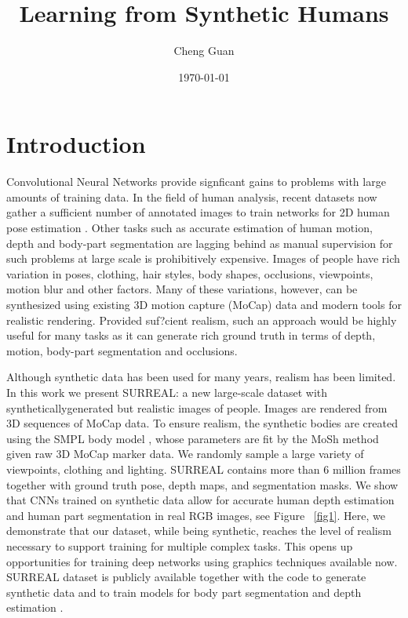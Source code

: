 \documentclass[10pt,twocolumn,a4paper]{article}
\title{\textbf{Learning from Synthetic Humans}}
\author{Cheng Guan}
\date{\today}
\begin{document}
\maketitle
\section{\textbf{Introduction}}
Convolutional Neural Networks provide signficant gains to problems with large amounts of training data. In the field of human analysis, recent datasets \cite{andriluka20142d,oliveira2016deep} now gather a sufficient number of annotated images to train networks for 2D human pose estimation \cite{okada2008relevant}. Other tasks such as accurate estimation of human motion, depth and body-part segmentation are lagging behind as manual supervision for such problems at large scale is prohibitively expensive. Images of people have rich variation in poses, clothing, hair styles, body shapes, occlusions, viewpoints, motion blur and other factors. Many of these variations, however, can be synthesized using existing 3D motion capture (MoCap) data  and modern tools for realistic rendering. Provided suf?cient realism, such an approach would be highly useful for many tasks as it can generate rich ground truth in terms of depth, motion, body-part segmentation and occlusions.
\par
Although synthetic data has been used for many years, realism has been limited. In this work we present SURREAL: a new large-scale dataset with syntheticallygenerated but realistic images of people. Images are rendered from 3D sequences of MoCap data. To ensure realism, the synthetic bodies are created using the SMPL body model , whose parameters are fit by the MoSh  method given raw 3D MoCap marker data. We randomly sample a large variety of viewpoints, clothing and lighting. SURREAL contains more than 6 million frames together with ground truth pose, depth maps, and segmentation masks. We show that CNNs trained on synthetic data allow for accurate human depth estimation and human part segmentation in real RGB images, see Figure ~\ref{fig1}. Here, we demonstrate that our dataset, while being synthetic, reaches the level of realism necessary to support training for multiple complex tasks. This opens up opportunities for training deep networks using graphics techniques available now. SURREAL dataset is publicly available together with the code to generate synthetic data and to train models for body part segmentation and depth estimation .
\par
\end{document}
